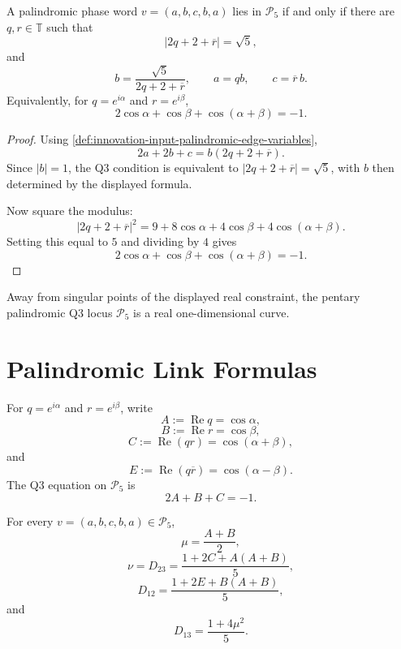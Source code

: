 \begin{theorem}
\label{thm:innovation-input-pentary-palindromic-qthree-equation}
A palindromic phase word $v=(a,b,c,b,a)$ lies in $\mathcal P_5$ if and
only if there are $q,r\in\mathbb T$ such that
$$
\left|2q+2+\overline r\right|=\sqrt5,
$$
and
$$
b=\frac{\sqrt5}{2q+2+\overline r},
\qquad
a=qb,
\qquad
c=\overline r\,b.
$$
Equivalently, for $q=e^{i\alpha}$ and $r=e^{i\beta}$,
$$
2\cos\alpha+\cos\beta+\cos(\alpha+\beta)=-1.
$$
\end{theorem}

\begin{proof}
Using
\autoref{def:innovation-input-palindromic-edge-variables},
$$
2a+2b+c
=
b(2q+2+\overline r).
$$
Since $|b|=1$, the Q3 condition is equivalent to
$|2q+2+\overline r|=\sqrt5$, with $b$ then determined by the displayed
formula.

Now square the modulus:
$$
\left|2q+2+\overline r\right|^2
=
9+8\cos\alpha+4\cos\beta+4\cos(\alpha+\beta).
$$
Setting this equal to $5$ and dividing by $4$ gives
$$
2\cos\alpha+\cos\beta+\cos(\alpha+\beta)=-1.
$$
\end{proof}

\begin{corollary}
\label{cor:innovation-input-pentary-palindromic-one-dimensional}
Away from singular points of the displayed real constraint, the pentary
palindromic Q3 locus $\mathcal P_5$ is a real one-dimensional curve.
\end{corollary}

\section{Palindromic Link Formulas}
\label{sec:innovation-input-palindromic-link-formulas}

\begin{definition}
\label{def:innovation-input-real-palindromic-edge-coordinates}
For $q=e^{i\alpha}$ and $r=e^{i\beta}$, write
$$
A:=\operatorname{Re}q=\cos\alpha,
$$
$$
B:=\operatorname{Re}r=\cos\beta,
$$
$$
C:=\operatorname{Re}(qr)=\cos(\alpha+\beta),
$$
and
$$
E:=\operatorname{Re}(q\overline r)=\cos(\alpha-\beta).
$$
The Q3 equation on $\mathcal P_5$ is
$$
2A+B+C=-1.
$$
\end{definition}

\begin{theorem}[Palindromic $L=3$ link formulas]
\label{thm:innovation-input-palindromic-lthree-link-formulas}
For every $v=(a,b,c,b,a)\in\mathcal P_5$,
$$
\mu=\frac{A+B}{2},
$$
$$
\nu=D_{23}
=
\frac{1+2C+A(A+B)}{5},
$$
$$
D_{12}
=
\frac{1+2E+B(A+B)}{5},
$$
and
$$
D_{13}
=
\frac{1+4\mu^2}{5}.
$$
\end{theorem}

